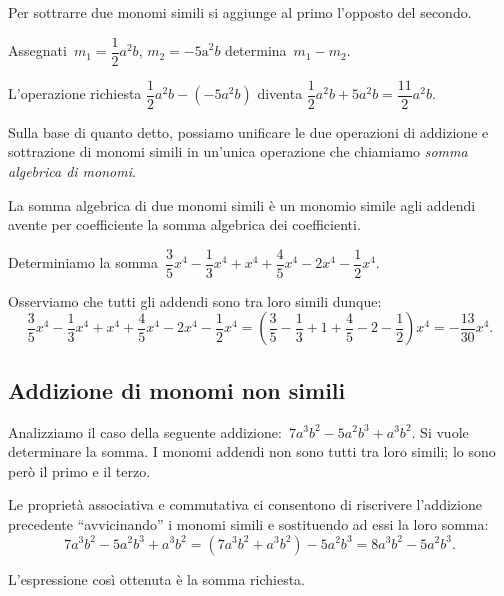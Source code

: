 \osservazione Per sottrarre due monomi simili si aggiunge al primo
l'opposto del secondo.

\begin{exrig}
 \begin{esempio}
Assegnati~$m_{{1}}=\dfrac{1}{2}a^{2}b$, $m_{2}=-\text{5a}^{2}b$ determina~$m_{1} - m_{2}$.

L'operazione richiesta
$\dfrac{1}{2}a^{2}b-(-5a^{2}b)$ diventa
$\dfrac{1}{2}a^{2}b+5a^{2}b=\dfrac{11}{2}a^{2}b$.
 \end{esempio}
\end{exrig}

Sulla base di quanto detto, possiamo unificare le due operazioni di
addizione e sottrazione di monomi simili in un'unica
operazione che chiamiamo \emph{somma algebrica di monomi}.

\osservazione La somma algebrica di due monomi simili è un monomio simile agli
addendi avente per coefficiente la somma algebrica dei coefficienti.

\begin{exrig}
 \begin{esempio}
Determiniamo la somma~$\dfrac{3}{5}x^{{4}}-\dfrac{1}{3}x^{{4}}+x^{{4}}+\dfrac{4}{5}x^{{4}}-2x^{{4}}-\dfrac{1}{2}x^{{4}}$.

Osserviamo che tutti gli addendi sono tra loro simili dunque:
\[\frac{3}{5}x^{{4}}-\frac{1}{3}x^{{4}}+x^{{4}}+\frac{4}{5}x^{{4}}-2x^{{4}}-\frac{1}{2}x^{{4}}=\left(\frac{3}{5}-\frac{1}{3}+1+\frac{4}{5}-2-\frac{1}{2}\right)x^{{4}}=-{\frac{13}{30}}x^{{4}}.\]
\end{esempio}
\end{exrig}
\subsection{Addizione di monomi non simili}

Analizziamo il caso della seguente
addizione:~$7a^{3}b^{2}-5a^{2}b^{3}+a^{3}b^{2}$. Si vuole determinare
la somma. I monomi addendi non sono tutti tra loro simili; lo sono
però il primo e il terzo.

Le proprietà associativa e commutativa ci consentono di riscrivere
l'addizione precedente
``avvicinando'' i monomi simili e
sostituendo ad essi la loro
somma:
\[7a^{3}b^{2}-5a^{2}b^{3}+a^{3}b^{2}=(7a^{3}b^{2}+a^{3}b^{2})-5a^{2}b^{3}=8a^{3}b^{2}-5a^{2}b^{3}.\]

L'espressione così ottenuta è la somma richiesta.

\vspazio\ovalbox{\risolvi \ref{ese:10.24}}\vspazio

